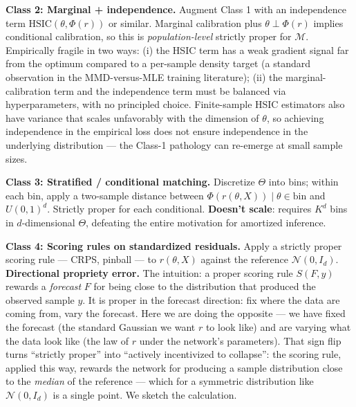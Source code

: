 \documentclass[11pt]{article}
\begin{document}
\textbf{Class 2: Marginal + independence.} Augment Class 1 with an
independence term \(\mathrm{HSIC}(\theta, \Phi(r))\) or similar.
Marginal calibration plus \(\theta \perp \Phi(r)\) implies conditional
calibration, so this is \emph{population-level} strictly proper for
\(\mathcal{M}\). Empirically fragile in two ways: (i) the HSIC term has
a weak gradient signal far from the optimum compared to a per-sample
density target (a standard observation in the MMD-versus-MLE training
literature); (ii) the marginal-calibration term and the independence
term must be balanced via hyperparameters, with no principled choice.
Finite-sample HSIC estimators also have variance that scales unfavorably
with the dimension of \(\theta\), so achieving independence in the
empirical loss does not ensure independence in the underlying
distribution --- the Class-1 pathology can re-emerge at small sample
sizes.

\textbf{Class 3: Stratified / conditional matching.} Discretize
\(\Theta\) into bins; within each bin, apply a two-sample distance
between \(\Phi(r(\theta, X)) \mid \theta \in \mathrm{bin}\) and
\(U(0,1)^d\). Strictly proper for each conditional. \textbf{Doesn't
scale}: requires \(K^d\) bins in \(d\)-dimensional \(\Theta\), defeating
the entire motivation for amortized inference.

\textbf{Class 4: Scoring rules on standardized residuals.} Apply a
strictly proper scoring rule --- CRPS, pinball --- to \(r(\theta, X)\)
against the reference \(\mathcal{N}(0, I_d)\). \textbf{Directional
propriety error.} The intuition: a proper scoring rule \(S(F, y)\)
rewards a \emph{forecast} \(F\) for being close to the distribution
that produced the observed sample \(y\). It is proper in the
forecast direction: fix where the data are coming from, vary the
forecast. Here we are doing the opposite --- we have fixed the
forecast (the standard Gaussian we want \(r\) to look like) and are
varying what the data look like (the law of \(r\) under the network's
parameters). That sign flip turns ``strictly proper'' into ``actively
incentivized to collapse'': the scoring rule, applied this way,
rewards the network for producing a sample distribution close to the
\emph{median} of the reference --- which for a symmetric distribution
like \(\mathcal{N}(0, I_d)\) is a single point. We sketch the
calculation.
\end{document}
